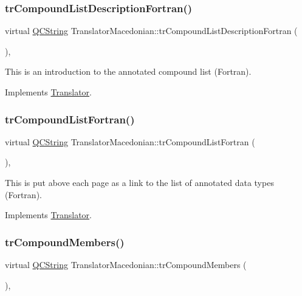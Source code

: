 \subsubsection{\texorpdfstring{trCompoundListDescriptionFortran()}{trCompoundListDescriptionFortran()}}
{\footnotesize\ttfamily virtual \mbox{\hyperlink{class_q_c_string}{Q\+C\+String}} Translator\+Macedonian\+::tr\+Compound\+List\+Description\+Fortran (\begin{DoxyParamCaption}{ }\end{DoxyParamCaption})\hspace{0.3cm}{\ttfamily [inline]}, {\ttfamily [virtual]}}

This is an introduction to the annotated compound list (Fortran). 

Implements \mbox{\hyperlink{class_translator}{Translator}}.

\mbox{\label{class_translator_macedonian_ac7f1d2e172ebc00b325a67d3851b1851}} 
\subsubsection{\texorpdfstring{trCompoundListFortran()}{trCompoundListFortran()}}
{\footnotesize\ttfamily virtual \mbox{\hyperlink{class_q_c_string}{Q\+C\+String}} Translator\+Macedonian\+::tr\+Compound\+List\+Fortran (\begin{DoxyParamCaption}{ }\end{DoxyParamCaption})\hspace{0.3cm}{\ttfamily [inline]}, {\ttfamily [virtual]}}

This is put above each page as a link to the list of annotated data types (Fortran). 

Implements \mbox{\hyperlink{class_translator}{Translator}}.

\mbox{\label{class_translator_macedonian_a1394cc18e66da40090adcae0d760df67}} 
\subsubsection{\texorpdfstring{trCompoundMembers()}{trCompoundMembers()}}
{\footnotesize\ttfamily virtual \mbox{\hyperlink{class_q_c_string}{Q\+C\+String}} Translator\+Macedonian\+::tr\+Compound\+Members (\begin{DoxyParamCaption}{ }\end{DoxyParamCaption})\hspace{0.3cm}{\ttfamily [inline]}, {\ttfamily [virtual]}}

